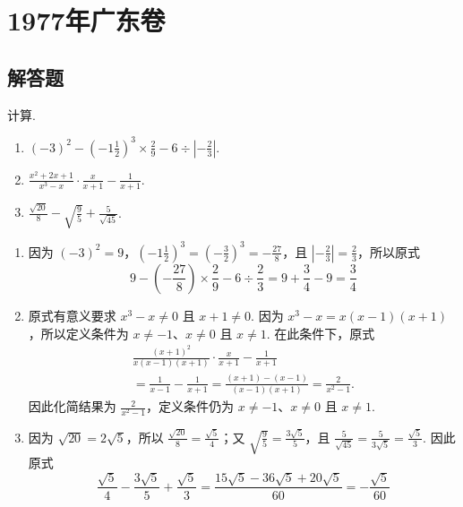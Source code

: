 \chapter{1977年广东卷}

\section{解答题}

\begin{problem}
计算.
\begin{enumerate}
    \item
    \(\left(-3\right)^2-\left(-1\frac{1}{2}\right)^3\times\frac{2}{9}-6\div\left|-\frac{2}{3}\right|\).
    \item
    \(\frac{x^2+2x+1}{x^3-x}\cdot\frac{x}{x+1}-\frac{1}{x+1}\).
    \item
    \(\frac{\sqrt{20}}{8}-\sqrt{\frac{9}{5}}+\frac{5}{\sqrt{45}}\).
\end{enumerate}
\end{problem}

\begin{solution}
\begin{enumerate}
\item 因为 \(\left(-3\right)^2=9\)，\(\left(-1\frac{1}{2}\right)^3=\left(-\frac{3}{2}\right)^3=-\frac{27}{8}\)，且 \(\left|-\frac{2}{3}\right|=\frac{2}{3}\)，所以原式
\[
9-\left(-\frac{27}{8}\right)\times\frac{2}{9}-6\div\frac{2}{3}=9+\frac{3}{4}-9=\frac{3}{4}
\]

\item 原式有意义要求 \(x^3-x\ne0\) 且 \(x+1\ne0\). 因为 \(x^3-x=x\left(x-1\right)\left(x+1\right)\)，所以定义条件为 \(x\ne-1\)、\(x\ne0\) 且 \(x\ne1\). 在此条件下，原式
\[
\begin{gathered}
\frac{\left(x+1\right)^2}{x\left(x-1\right)\left(x+1\right)}\cdot\frac{x}{x+1}-\frac{1}{x+1} \\
=\frac{1}{x-1}-\frac{1}{x+1}=\frac{\left(x+1\right)-\left(x-1\right)}{\left(x-1\right)\left(x+1\right)}=\frac{2}{x^2-1}.
\end{gathered}
\]
因此化简结果为 \(\frac{2}{x^2-1}\)，定义条件仍为 \(x\ne-1\)、\(x\ne0\) 且 \(x\ne1\).

\item 因为 \(\sqrt{20}=2\sqrt{5}\)，所以 \(\frac{\sqrt{20}}{8}=\frac{\sqrt{5}}{4}\)；又 \(\sqrt{\frac{9}{5}}=\frac{3\sqrt{5}}{5}\)，且
\(\frac{5}{\sqrt{45}}=\frac{5}{3\sqrt{5}}=\frac{\sqrt{5}}{3}\). 因此原式
\[
\frac{\sqrt{5}}{4}-\frac{3\sqrt{5}}{5}+\frac{\sqrt{5}}{3}
=\frac{15\sqrt{5}-36\sqrt{5}+20\sqrt{5}}{60}=-\frac{\sqrt{5}}{60}
\]
\end{enumerate}
\end{solution}

